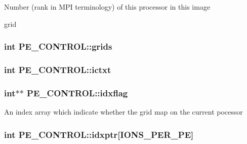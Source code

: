 \begin{DoxyVerb}Number (rank in MPI terminology) of this processor in this image
\end{DoxyVerb}
 grid \hypertarget{struct_p_e___c_o_n_t_r_o_l_ae44c86d95d75ae6b911a8e07c074e623}{
\subsubsection[{grids}]{\setlength{\rightskip}{0pt plus 5cm}int P\-E\-\_\-\-C\-O\-N\-T\-R\-O\-L\-::grids}}\label{struct_p_e___c_o_n_t_r_o_l_ae44c86d95d75ae6b911a8e07c074e623}
\hypertarget{struct_p_e___c_o_n_t_r_o_l_a61d1e089eeb96518b45adde2f79a3ed9}{
\subsubsection[{ictxt}]{\setlength{\rightskip}{0pt plus 5cm}int P\-E\-\_\-\-C\-O\-N\-T\-R\-O\-L\-::ictxt}}\label{struct_p_e___c_o_n_t_r_o_l_a61d1e089eeb96518b45adde2f79a3ed9}
\hypertarget{struct_p_e___c_o_n_t_r_o_l_a528fbfe72c4e92b521ec1cbcf1269464}{
\subsubsection[{idxflag}]{\setlength{\rightskip}{0pt plus 5cm}int$\ast$$\ast$ P\-E\-\_\-\-C\-O\-N\-T\-R\-O\-L\-::idxflag}}\label{struct_p_e___c_o_n_t_r_o_l_a528fbfe72c4e92b521ec1cbcf1269464}
An index array which indicate whether the grid map on the current pocessor \hypertarget{struct_p_e___c_o_n_t_r_o_l_ab73cab14e4a492b908125c4594bc120b}{
\subsubsection[{idxptr}]{\setlength{\rightskip}{0pt plus 5cm}int P\-E\-\_\-\-C\-O\-N\-T\-R\-O\-L\-::idxptr\mbox{[}{\bf I\-O\-N\-S\-\_\-\-P\-E\-R\-\_\-\-P\-E}\mbox{]}}}\label{struct_p_e___c_o_n_t_r_o_l_ab73cab14e4a492b908125c4594bc120b}
